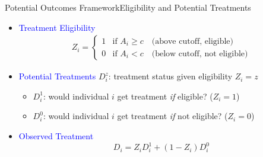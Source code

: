 \documentclass[hyperref={pdfpagelabels=false}]{beamer}
\begin{document}
\begin{frame}{Potential Outcomes Framework}{Eligibility and Potential Treatments}

\begin{itemize}

    \item \textcolor{blue}{Treatment Eligibility}
    \begin{align*}
        Z_{i}=\begin{cases}
            1 & \text{if } A_i\geq c \quad \text{(above cutoff, eligible)}\\
            0 & \text{if } A_i < c  \quad \text{(below cutoff, not eligible)}
        \end{cases}
    \end{align*}

    \vspace{0.2cm}
    \item \textcolor{blue}{Potential Treatments} \;
          $D^z_i$: treatment status given eligibility $Z_i = z$
    \vspace{0.1cm}
    \begin{itemize}
        \item $D^{1}_i$: would individual $i$ get treatment
              \emph{if} eligible? ($Z_i=1$)
        \vspace{0.1cm}
        \item $D^{0}_i$: would individual $i$ get treatment
              \emph{if} not eligible? ($Z_i=0$)
    \end{itemize}

    \vspace{0.2cm}
    \item \textcolor{blue}{Observed Treatment}
    \begin{equation*}
        D_{i} = Z_{i}D^{1}_{i} + (1-Z_{i})D^{0}_{i}
    \end{equation*}

\end{itemize}
\end{frame}



\end{document}
